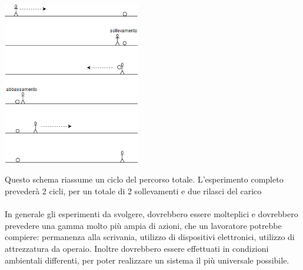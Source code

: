 \documentclass[a4paper]{article}
\begin{document}
\makebox[\linewidth]{}
\begin{minipage}{\linewidth}
\begin{center}
\includegraphics[width=60mm,scale=0.7]{./images/esperimento1.png} 
\makebox[\linewidth]{}
\end{center}
\end{minipage}
\makebox[\linewidth]{} 
\makebox[\linewidth]{}
\makebox[\linewidth]{}
\makebox[\linewidth]{}
Questo schema riassume un ciclo del percorso totale. L’esperimento completo prevederà 2 cicli, per un totale di 2 sollevamenti e due rilasci del carico\\ \\
In generale gli esperimenti da svolgere, dovrebbero essere molteplici e dovrebbero prevedere una gamma molto più ampia di azioni, che un lavoratore potrebbe compiere: permanenza alla scrivania, utilizzo di dispositivi elettronici, utilizzo di attrezzatura da operaio. Inoltre dovrebbero essere effettuati in condizioni ambientali differenti, per poter realizzare un sistema il più universale possibile.

\clearpage


\end{document}
